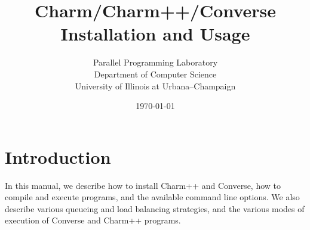 \documentclass[11pt]{article}
\begin{document}
 
\begin{titlepage}

\title{
\vspace*{3in}
Charm/Charm++/Converse Installation and Usage
}

\author{Parallel Programming Laboratory\\
	Department of Computer Science\\
	University of Illinois at Urbana--Champaign}
\date{\today}

\maketitle

\end{titlepage}

\newpage
\pagestyle{headings}

\section{Introduction}
In this manual, we describe how to install Charm++ and
Converse, how to compile and execute programs, and the available
command line options.  We also describe various queueing and load balancing
strategies, and the various modes of execution of Converse and Charm++
programs.




\end{document}
